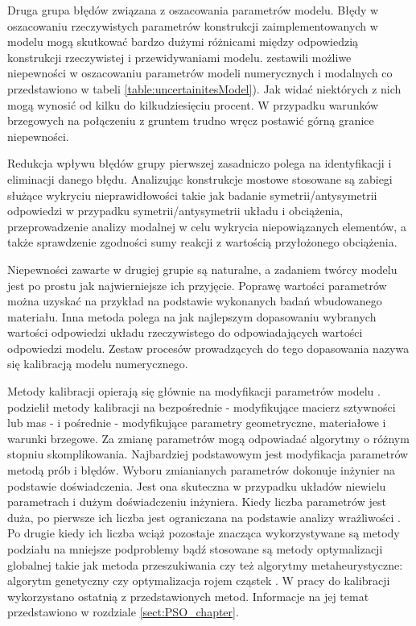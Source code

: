 Druga grupa błędów związana z oszacowania parametrów modelu. Błędy w oszacowaniu rzeczywistych parametrów konstrukcji zaimplementowanych w modelu mogą skutkować bardzo dużymi różnicami między odpowiedzią konstrukcji rzeczywistej i przewidywaniami modelu. \cite{Brincker2015} zestawili możliwe niepewności w oszacowaniu parametrów modeli numerycznych i modalnych co przedstawiono w tabeli \ref{table:uncertainitesModel}). Jak widać niektórych z nich mogą wynosić od kilku do kilkudziesięciu procent. W przypadku warunków brzegowych na połączeniu z gruntem trudno wręcz postawić górną granice niepewności. 

Redukcja wpływu błędów grupy pierwszej zasadniczo polega na identyfikacji i eliminacji danego błędu. Analizując konstrukcje mostowe stosowane są zabiegi służące wykryciu nieprawidłowości takie jak badanie symetrii/antysymetrii odpowiedzi w przypadku symetrii/antysymetrii układu i obciążenia, przeprowadzenie analizy modalnej w celu wykrycia niepowiązanych elementów, a także sprawdzenie zgodności sumy reakcji z wartością przyłożonego obciążenia. 

Niepewności zawarte w drugiej grupie są naturalne, a zadaniem twórcy modelu jest po prostu jak najwierniejsze ich przyjęcie. Poprawę wartości parametrów można uzyskać na przykład na podstawie wykonanych badań wbudowanego materiału. Inna metoda polega na jak najlepszym dopasowaniu wybranych wartości odpowiedzi układu rzeczywistego do odpowiadających wartości odpowiedzi modelu. Zestaw procesów prowadzących do tego dopasowania nazywa się kalibracją modelu numerycznego. 

Metody kalibracji opierają się głównie na modyfikacji parametrów modelu . \cite{Batou2019} podzielił metody kalibracji na bezpośrednie - modyfikujące macierz sztywności lub mas - i pośrednie - modyfikujące parametry geometryczne, materiałowe i warunki brzegowe. Za zmianę parametrów mogą odpowiadać algorytmy o różnym stopniu skomplikowania. Najbardziej podstawowym jest modyfikacja parametrów metodą prób i błędów. Wyboru zmianianych parametrów dokonuje inżynier na podstawie doświadczenia. Jest ona skuteczna w przypadku układów niewielu parametrach i dużym doświadczeniu inżyniera. Kiedy liczba parametrów jest duża, po pierwsze ich liczba jest ograniczana na podstawie analizy wrażliwości \parencite{Friswell2001,Mottershead2011,Petersen2017,Batou2019}. Po drugie kiedy ich liczba wciąż pozostaje znacząca wykorzystywane są metody podziału na mniejsze podproblemy \parencite{Weng2020,Yu2016} bądź stosowane są metody optymalizacji globalnej takie jak metoda przeszukiwania czy też algorytmy metaheurystyczne: algorytm genetyczny czy optymalizacja rojem cząstek \parencite{Boulkaibet2015,Tran-Ngoc2018,Dan2015,Qin2018}. W pracy do kalibracji wykorzystano ostatnią z przedstawionych metod. Informacje na jej temat przedstawiono w rozdziale \ref{sect:PSO_chapter}.

